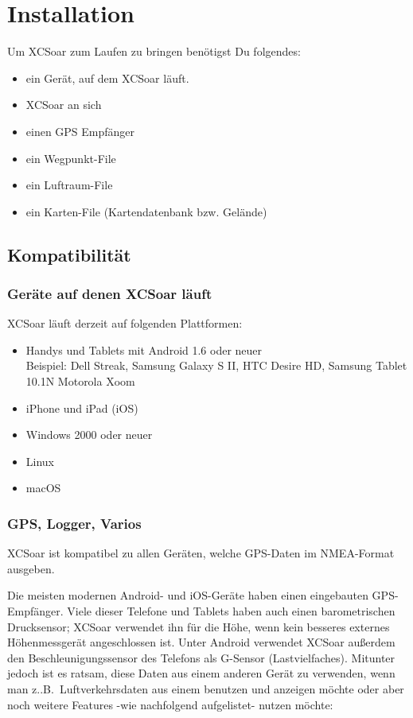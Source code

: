 \chapter{Installation}\label{cha:installation}

Um {\textsf  XCSoar} zum Laufen zu bringen benötigst Du folgendes:


\begin{itemize}
\item ein Gerät, auf dem {\textsf  XCSoar} läuft.
\item {\textsf  XCSoar} an sich
\item einen GPS Empfänger
\item ein Wegpunkt-File
\item ein Luftraum-File
\item ein Karten-File (Kartendatenbank bzw. Gelände)
\end{itemize}

\section{Kompatibilität}

\subsection*{Geräte auf denen  {\textsf  XCSoar} läuft}

{\textsf  XCSoar} läuft derzeit auf folgenden Plattformen:

\begin{itemize}
\item Handys und Tablets mit Android 1.6 oder neuer\\
  Beispiel: Dell Streak, Samsung Galaxy S II, HTC Desire HD, Samsung Tablet 10.1N
  Motorola Xoom
\item iPhone und iPad (iOS)
\item Windows 2000 oder neuer
\item Linux
\item macOS
\end{itemize}

\subsection*{GPS, Logger, Varios}

{\textsf  XCSoar}  ist kompatibel zu allen Geräten, welche GPS-Daten im NMEA-Format ausgeben.

Die meisten modernen Android- und iOS-Geräte haben einen eingebauten GPS-Empfänger.  Viele dieser Telefone und Tablets haben auch einen barometrischen Drucksensor; {\textsf  XCSoar} verwendet ihn für die Höhe, wenn kein besseres externes Höhenmessgerät angeschlossen ist. Unter Android verwendet {\textsf  XCSoar} außerdem den Beschleunigungssensor des Telefons als G-Sensor (Lastvielfaches). Mitunter jedoch ist es ratsam, diese Daten aus einem anderen Gerät zu verwenden, wenn man z..B.\ Luftverkehrsdaten aus einem 
\fl benutzen und anzeigen möchte oder aber noch weitere Features -wie nachfolgend aufgelistet- nutzen möchte:



